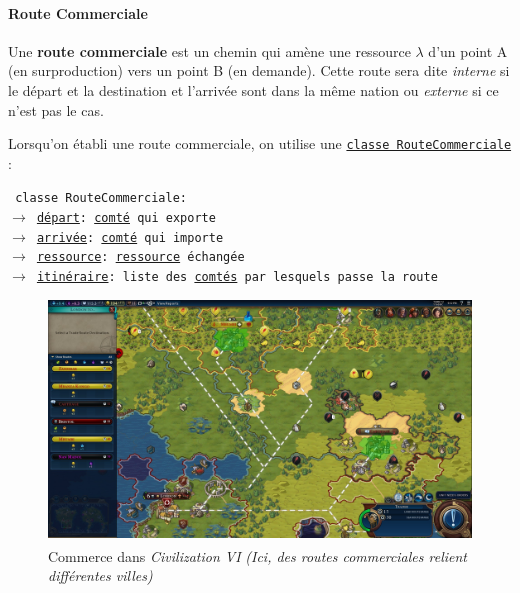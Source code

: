 \documentclass{article}
\newcommand{\ulcolor}[2][class]{\setulcolor{#1}\ul{#2}}
\newcommand{\ulcolor}[2][var]{\setulcolor{#1}\ul{#2}}
\newcommand{\ulcolor}[2][func]{\setulcolor{#1}\ul{#2}}
\newcommand*{\mybox}[2]{\colorbox{#1!30}{\parbox{.98\linewidth}{#2}}}
\newcommand\tab[1][0.5cm]{\hspace*{#1}}
\newcommand{\genbox}[1]{\mybox{verylightgray}{#1}}
\newcommand{\classbox}[1]{\mybox{palegreen}{\texttt{\textcolor{codeColour}{#1}}}}
\newcommand{\class}[1]{\texttt{\textcolor{codeColour}{\ulcolor[class]{#1}}}}
\newcommand{\var}[1]{\texttt{\textcolor{codeColour}{\ulcolor[var]{#1}}}}
\def\reg{\small{\textsuperscript{\textregistered}}}
\begin{document}
                \paragraph{Route Commerciale}
                    Une \textbf{route commerciale} est un chemin qui amène une ressource $\lambda$ d'un point A (en surproduction) vers un point B (en demande). Cette route sera dite \emph{interne} si le départ et la destination et l'arrivée sont dans la même nation ou \emph{externe} si ce n'est pas le cas. \\ 

                    \tab \genbox{
                    Lorsqu'on établi une route commerciale, on utilise une \class{classe RouteCommerciale}  : \\
                    \tab \classbox{
                        classe RouteCommerciale:\\
                            $\rightarrow$ \var{d\'epart}: \class{comt\'e} qui exporte \\
                            $\rightarrow$ \var{arriv\'ee}: \class{comt\'e} qui importe \\
                            $\rightarrow$ \var{ressource}: \class{ressource} échangée \\
                            $\rightarrow$ \var{itin\'eraire}: liste des \class{comt\'es} par lesquels passe la route \\
                    } 
                }

                    \begin{figure}[h]
                        \centering
                            \includegraphics[scale=0.15]{image_civ6_commerce.jpeg}
                            \caption{Commerce dans \textit{Civilization VI\reg} \textit{(Ici, des routes commerciales relient différentes villes)}}
                            \label{fig:x photosysteme}
                    \end{figure}
\end{document}
